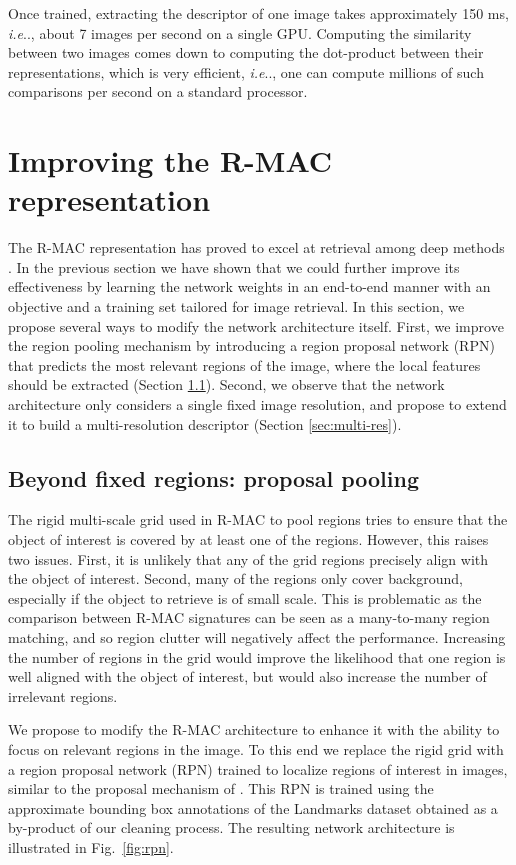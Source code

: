 \documentclass[twocolumn]{svjour3}          \smartqed  \usepackage{graphicx}
\makeatletter
\DeclareRobustCommand\onedot{\futurelet\@let@token\@onedot}
\def\@onedot{\ifx\@let@token.\else.\null\fi\xspace}
\def\ie{\emph{i.e}\onedot} \def\Ie{\emph{I.e}\onedot}
\makeatother
\begin{document}
Once trained, extracting the descriptor of one image takes approximately 150 ms, \ie, about 7 images per second on a single GPU. Computing the similarity between two images comes down to computing the dot-product between their representations, which is very efficient, \ie, one can compute millions of such comparisons per second on a standard processor.

 


\section{Improving the R-MAC representation}
\label{sec:part2}

The R-MAC representation has proved to excel at retrieval among deep methods \citep{Tolias2016}. In the previous section we have shown that we could further improve its effectiveness by learning the network weights in an end-to-end manner with an objective and a training set tailored for image retrieval. In this section, we propose several ways to modify the network architecture itself.
First, we improve the region pooling mechanism by introducing a region proposal network (RPN) that predicts the most relevant regions of the image, where the local features should be extracted (Section \ref{sec:proposal}). Second, we observe that the network architecture only considers a single fixed image resolution, and propose to extend it to build a multi-resolution descriptor (Section \ref{sec:multi-res}).

\subsection{Beyond fixed regions: proposal pooling}
\label{sec:proposal}
The rigid multi-scale grid used in R-MAC to pool regions tries to ensure that the object of interest is covered by at least one of the regions.
However, this raises two issues. First, it is unlikely that any of the grid regions precisely align with the object of interest.
Second, many of the regions only cover background, especially if the object to retrieve is of small scale. This is problematic as the comparison between R-MAC signatures can be seen as a many-to-many region matching, and so region clutter will negatively affect the performance. Increasing the number of regions in the grid would improve the likelihood that one region is well aligned with the object of interest, but would also increase the number of irrelevant regions.

We propose to modify the R-MAC architecture to enhance it with the ability to focus on relevant regions in the image. To this end we replace the rigid grid with a region proposal network (RPN) trained to localize regions of interest in images, similar to the proposal mechanism of \cite{Ren2015faster}. This RPN is trained using the approximate bounding box annotations of the Landmarks dataset obtained as a by-product of our cleaning process.
The resulting network architecture is illustrated in Fig.~\ref{fig:rpn}. 
\end{document}
